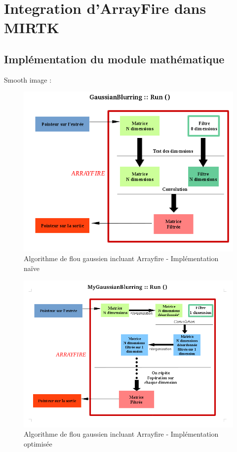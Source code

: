 \documentclass[10pt]{report}
\begin{document}
	
	\section{Integration d'ArrayFire dans MIRTK}
	\subsection{Implémentation du module mathématique}
Smooth image :
	\begin{figure}[h!]
		\begin{center}
			\includegraphics[width=12cm]{Reports/figures/gaussianblurring.png}
		\end{center}	
		\caption{Algorithme de flou gaussien incluant Arrayfire - Implémentation naïve}
		\label{Algorithme de flou gaussien incluant Arrayfire - Implémentation naïve}
	\end{figure}
	\begin{figure}[h!]
		\begin{center}
			\includegraphics[width=12cm]{Reports/figures/mygaussianblurring.png}
		\end{center}	
		\caption{Algorithme de flou gaussien incluant Arrayfire - Implémentation optimisée}
		\label{Algorithme de flou gaussien incluant Arrayfire - Implémentation optimisée}
	\end{figure}
\end{document}
